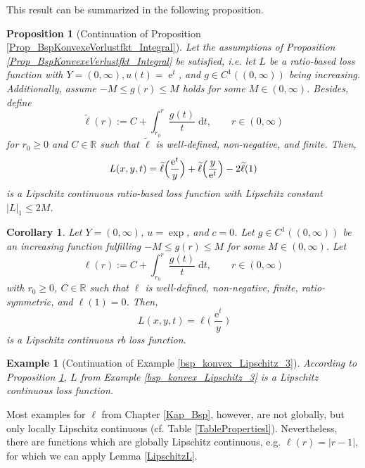 \documentclass[10pt]{article}
\newcommand{\R}{\mathbb{R}}
\DeclareMathOperator{\e}{e}
\newcommand{\dd}{\mathrm{d}}
\newtheorem{proposition}[theorem]{Proposition}
\newtheorem{example}[theorem]{Example}
\newtheorem{corollary}[theorem]{Corollary}
\begin{document}
This result can be summarized in the following proposition.
\begin{proposition}[Continuation of Proposition \ref{Prop_BspKonvexeVerlustfkt_Integral}] \label{Prop_Lipschitz_Integral}
	Let the assumptions of Proposition \ref{Prop_BspKonvexeVerlustfkt_Integral} be satisfied, i.e. let $L$ be a ratio-based loss function with $Y = (0, \infty), u(t) =\e^t$, and $g \in C^1((0, \infty))$ being increasing. 
	Additionally, assume $-M \leq g(r) \leq M$ holds for some $M \in (0, \infty)$.
	Besides, define
	\begin{equation*}
		\widetilde{\ell}(r) := C + \int_{r_0}^r \frac{g(t)}{t} \; \mathrm{d}t, \qquad r \in (0, \infty)
	\end{equation*}
	for $r_0 \geq 0$ and $C \in \R$ such that $\widetilde{\ell}$ is well-defined, non-negative, and finite.
	Then,
	\begin{equation*}
		L(x,y,t) = \widetilde{\ell}\Bigl(\frac{\e^t}{y}\Bigr)+\widetilde{\ell}\Bigl(\frac{y}{\e^t}\Bigr)-2\widetilde{\ell}(1)
	\end{equation*}
	is a Lipschitz continuous ratio-based loss function with Lipschitz constant $|L|_1 \leq 2M$.
\end{proposition}
\begin{corollary}
	Let $Y = (0, \infty)$, $u = \exp$, and $c = 0$. Let $g \in C^1((0, \infty))$ be an increasing function fulfilling $-M \leq g(r) \leq M$ for some $M \in (0, \infty)$.
	Let 
	\begin{equation*}
		\ell(r) := C + \int_{r_0}^r \frac{g(t)}{t} \; \dd t, \qquad r \in (0, \infty)
	\end{equation*}
	with $r_0 \geq 0$, $C \in \R$ such that $\ell$ is well-defined, non-negative, finite, ratio-symmetric, and $\ell(1) = 0$.
	Then, 
	\begin{equation*}
		L(x,y,t) = \ell\biggl(\frac{\e^t}{y}\biggr) 
	\end{equation*}
	is a Lipschitz continuous rb loss function.
\end{corollary}
\begin{example}[Continuation of Example \ref{bsp_konvex_Lipschitz_3}]
	According to Proposition \ref{Prop_Lipschitz_Integral}, $L$ from Example \ref{bsp_konvex_Lipschitz_3} is a Lipschitz continuous loss function.
\end{example}
Most examples for $\ell$ from Chapter \ref{Kap_Bsp}, however, are not globally, but only locally Lipschitz continuous (cf. Table \ref{TablePropertiesl}).
Nevertheless, there are functions which are globally Lipschitz continuous, e.g. $\ell(r) = |r-1|$, for which we can apply Lemma \ref{LipschitzL}.
\end{document}
